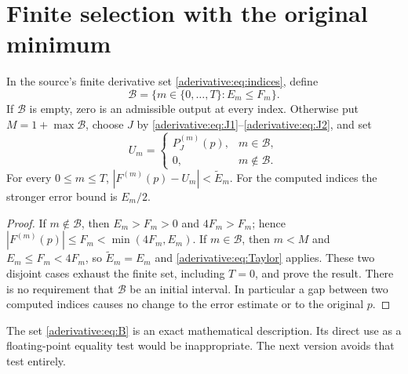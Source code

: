 \documentclass[11pt]{article}
\begin{document}
\section{Finite selection with the original minimum}
\label{aderivative:sec:selection}
\begin{aderivativeproposition}\label{aderivative:prop:finite}
In the source's finite derivative set \eqref{aderivative:eq:indices}, define
\begin{equation}\label{aderivative:eq:B}
\mathcal B=\{m\in\{0,\ldots,T\}: E_m\le F_m\}.
\end{equation}
If $\mathcal B$ is empty, zero is an admissible output at every
index. Otherwise put $M=1+\max\mathcal B$, choose $J$ by
\eqref{aderivative:eq:J1}--\eqref{aderivative:eq:J2}, and set
\begin{equation}\label{aderivative:eq:output}
U_m=\begin{cases}P_J^{(m)}(p),&m\in\mathcal B,\\
0,&m\notin\mathcal B.
\end{cases}
\end{equation}
For every $0\le m\le T$,
$|F^{(m)}(p)-U_m|<\widetilde E_m$.
For the computed indices the stronger error bound is $E_m/2$.
\end{aderivativeproposition}
\begin{proof}
If $m\notin\mathcal B$, then $E_m>F_m>0$ and $4F_m>F_m$;
hence $|F^{(m)}(p)|\le F_m<\min(4F_m,E_m)$.
If $m\in\mathcal B$, then $m<M$ and
$E_m\le F_m<4F_m$, so $\widetilde E_m=E_m$ and
\eqref{aderivative:eq:Taylor} applies. These two disjoint cases exhaust
the finite set, including $T=0$, and prove the result.
There is no requirement that $\mathcal B$ be an initial interval.
In particular a gap between two computed indices causes no
change to the error estimate or to the original $p$.
\end{proof}

The set \eqref{aderivative:eq:B} is an exact mathematical description.
Its direct use as a floating-point equality test would be
inappropriate. The next version avoids that test entirely.
\end{document}
